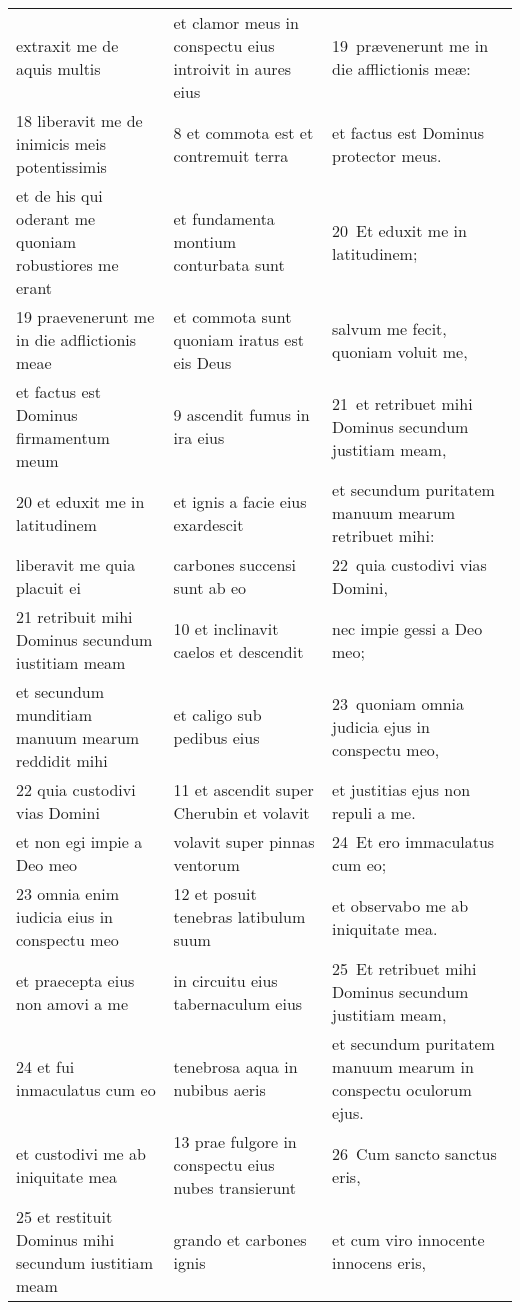 \documentclass{article}
\begin{document}
\begin{longtable}{@{}p{}p{}p{}@{}}
extraxit me de aquis multis	&	et clamor meus in conspectu eius introivit in aures eius	&	19 prævenerunt me in die afflictionis meæ:	\\
18 liberavit me de inimicis meis potentissimis	&	8 et commota est et contremuit terra	&	et factus est Dominus protector meus.	\\
et de his qui oderant me quoniam robustiores me erant	&	et fundamenta montium conturbata sunt	&	20 Et eduxit me in latitudinem;	\\
19 praevenerunt me in die adflictionis meae	&	et commota sunt quoniam iratus est eis Deus	&	salvum me fecit, quoniam voluit me,	\\
et factus est Dominus firmamentum meum	&	9 ascendit fumus in ira eius	&	21 et retribuet mihi Dominus secundum justitiam meam,	\\
20 et eduxit me in latitudinem	&	et ignis a facie eius exardescit	&	et secundum puritatem manuum mearum retribuet mihi:	\\
liberavit me quia placuit ei	&	carbones succensi sunt ab eo	&	22 quia custodivi vias Domini,	\\
21 retribuit mihi Dominus secundum iustitiam meam	&	10 et inclinavit caelos et descendit	&	nec impie gessi a Deo meo;	\\
et secundum munditiam manuum mearum reddidit mihi	&	et caligo sub pedibus eius	&	23 quoniam omnia judicia ejus in conspectu meo,	\\
22 quia custodivi vias Domini	&	11 et ascendit super Cherubin et volavit	&	et justitias ejus non repuli a me.	\\
et non egi impie a Deo meo	&	volavit super pinnas ventorum	&	24 Et ero immaculatus cum eo;	\\
23 omnia enim iudicia eius in conspectu meo	&	12 et posuit tenebras latibulum suum	&	et observabo me ab iniquitate mea.	\\
et praecepta eius non amovi a me	&	in circuitu eius tabernaculum eius	&	25 Et retribuet mihi Dominus secundum justitiam meam,	\\
24 et fui inmaculatus cum eo	&	tenebrosa aqua in nubibus aeris	&	et secundum puritatem manuum mearum in conspectu oculorum ejus.	\\
et custodivi me ab iniquitate mea	&	13 prae fulgore in conspectu eius nubes transierunt	&	26 Cum sancto sanctus eris,	\\
25 et restituit Dominus mihi secundum iustitiam meam	&	grando et carbones ignis	&	et cum viro innocente innocens eris,	\\

\end{longtable}
\end{document}
